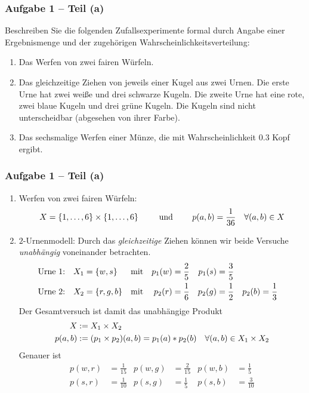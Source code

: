 \documentclass{beamer}
\begin{document}
\begin{frame} \frametitle{Aufgabe 1 -- Teil (a)}
	\justifying\small
	Beschreiben Sie die folgenden Zufallsexperimente formal durch Angabe einer Ergebnismenge und der zugehörigen Wahrscheinlichkeitsverteilung:
	\begin{enumerate}[1.]
		\item Das Werfen von zwei fairen Würfeln.
		\item Das gleichzeitige Ziehen von jeweils einer Kugel aus zwei Urnen. Die erste Urne hat
		zwei weiße und drei schwarze Kugeln. Die zweite Urne hat eine rote, zwei blaue Kugeln
		und drei grüne Kugeln. Die Kugeln sind nicht unterscheidbar (abgesehen von ihrer
		Farbe).
		\item Das sechsmalige Werfen einer Münze, die mit Wahrscheinlichkeit $0.3$ Kopf ergibt.
	\end{enumerate}
\end{frame}

\begin{frame} \frametitle{Aufgabe 1 -- Teil (a)}
	\footnotesize
	\begin{enumerate}[1.]
		\item Werfen von zwei fairen Würfeln: 
		\begin{equation*}
			X = \left\{ 1, \dots, 6 \right\} \times \left\{ 1, \dots, 6 \right\} \qquad \text{ und } \qquad p(a,b) = \frac{1}{36} \quad \forall (a,b) \in X
		\end{equation*}
		\item $2$-Urnenmodell: Durch das \textit{gleichzeitige} Ziehen können wir beide Versuche \textit{unabhängig} voneinander betrachten.
		\begin{align*}
			&\text{Urne 1:} & X_1 &= \left\{ w, s \right\} &&\text{mit} & p_1(w) &= \frac{2}{5} & p_1(s) &= \frac{3}{5} \\
			&\text{Urne 2:} & X_2 &= \left\{ r,g,b \right\} &&\text{mit} & p_2(r) &= \frac{1}{6} & p_2(g) &= \frac{1}{2}  & p_2(b) &= \frac{1}{3}
		\end{align*} 
		Der Gesamtversuch ist damit das unabhängige Produkt 
		\begin{align*}
			X &\mathrel{:=} X_1 \times X_2 \\
			p(a,b) &\mathrel{:=} (p_1 \times p_2)(a,b) = p_1(a) * p_2(b) \quad \forall (a,b) \in X_1 \times X_2
		\end{align*}
		Genauer ist
		\begin{align*}
			p(w,r) &= \frac{1}{15} & p(w,g) &= \frac{2}{15} & p(w, b) &= \frac{1}{5} \\
			p(s,r) &= \frac{1}{10} & p(s,g) &= \frac{1}{5} & p(s, b) &= \frac{3}{10}
		\end{align*}
	\end{enumerate}
\end{frame}
\end{document}
